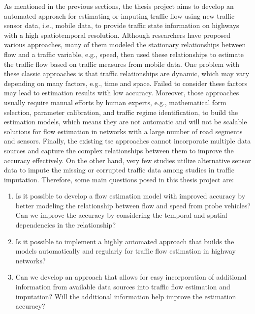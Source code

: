 \documentclass[english]{kththesis}
\begin{document}
As mentioned in the previous sections, the thesis project aims to develop an automated approach for estimating or imputing traffic flow using new traffic sensor data, i.e., mobile data, to provide traffic state information on highways with a high spatiotemporal resolution. Although researchers have proposed various approaches, many of them modeled the stationary relationships between flow and a traffic variable, e.g., speed, then used these relationships to estimate the traffic flow based on traffic measures from mobile data. One problem with these classic approaches is that traffic relationships are dynamic, which may vary depending on many factors, e.g., time and space. Failed to consider these factors may lead to estimation results with low accuracy. Moreover, those approaches usually require manual efforts by human experts, e.g., mathematical form selection, parameter calibration, and traffic regime identification, to build the estimation models, which means they are not automatic and will not be scalable solutions for flow estimation in networks with a large number of road segments and sensors. Finally, the existing \gls{tse} approaches cannot incorporate multiple data sources and capture the complex relationships between them to improve the accuracy effectively. On the other hand, very few studies utilize alternative sensor data to impute the missing or corrupted traffic data among studies in traffic imputation. Therefore, some main questions posed in this thesis project are:
\begin{enumerate}
    \item Is it possible to develop a flow estimation model with improved accuracy by better modeling the relationship between flow and speed from probe vehicles? Can we improve the accuracy by considering the temporal and spatial dependencies in the relationship?
    \item Is it possible to implement a highly automated approach that builds the models automatically and regularly for traffic flow estimation in highway networks?
    \item Can we develop an approach that allows for easy incorporation of additional information from available data sources into traffic flow estimation and imputation? Will the additional information help improve the estimation accuracy?
\end{enumerate}
\end{document}
